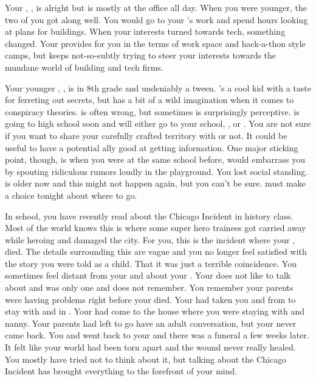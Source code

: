 \documentclass[char]{LRSguildcamp1}
\begin{document}
Your \cArchitect{\parent}, \cArchitect{}, is alright but is mostly at the office all day. When you were younger, the two of you got along well. You would go to your \cArchitect{\parent}'s work and spend hours looking at plans for buildings. When your interests turned towards tech, something changed. Your \cArchitect{\parent} provides for you in the terms of work space and hack-a-thon style camps, but keeps not-so-subtly trying to steer your interests towards the mundane world  of building and tech firms. 

Your younger \cTween{\sibling}, \cTween{}, is in 8th grade and undeniably a tween. \cTween{}'s a cool kid with a taste for ferreting out secrets, but has a bit of a wild imagination when it comes to conspiracy theories. \cTween{\They} is often wrong, but sometimes is surprisingly perceptive. \cTween{} is going to high school soon and will either go to your school, \pNormalSchool{}, or \pSuperSchool{}. You are not sure if you want to share your carefully crafted territory with \cTween{\them} or not. It could be useful to have a potential ally good at getting information. One major sticking point, though, is when you were at the same school before, \cTween{} would embarrass you by spouting ridiculous rumors loudly in the playground. You lost social standing. \cTween{} is older now and this might not happen again, but you can't be sure. \cTween{} must make a choice tonight about where to go.

In school, you have recently read about the Chicago Incident in history class. Most of the world knows this is where some super hero trainees got carried away while heroing and damaged the city. For you, this is the incident where your \cAS{\parent},\cAS{\full} died. The details surrounding this are vague and you no longer feel satisfied with the story you were told as a child. That it was just a terrible coincidence. You sometimes feel distant from your\cArchitect{\parent} and \cTween{} about your \cAS{\parent}. Your \cArchitect{\parent} does not like to talk about \cAS{} and \cTween{} was only one and does not remember. You remember your parents were having problems right before your \cAS{\parent} died. Your \cAS{\parent} had taken you and \cTween{} from \pCityArchitect{} to stay with \cOS{} and \cGrad{} in \pCityO{}. Your \cArchitect{\parent} had come to the house where you were staying with \cGrad{} and \cGrad{\their} nanny. Your parents had left to go have an adult conversation, but your \cAS{\parent} never came back. You and \cTween{} went back to your \pCityArchitect{} and there was a funeral a few weeks later. It felt like your world had been torn apart and the wound never really healed. You mostly have tried not to think about it, but talking about the Chicago Incident has brought everything to the forefront of your mind.
\end{document}
